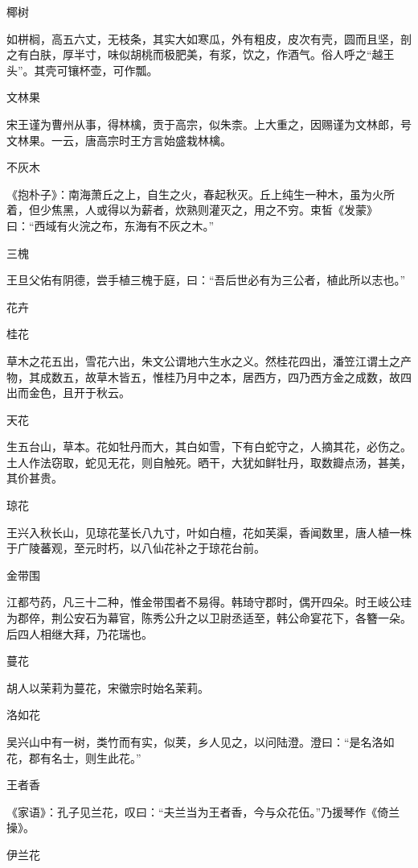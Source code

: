 \documentclass[a4paper,12pt,UTF8,twoside]{ctexbook}
\begin{document}
    椰树
    
    如栟榈，高五六丈，无枝条，其实大如寒瓜，外有粗皮，皮次有壳，圆而且坚，剖之有白肤，厚半寸，味似胡桃而极肥美，有浆，饮之，作酒气。俗人呼之“越王头”。其壳可镶杯壶，可作瓢。
    
    文林果
    
    宋王谨为曹州从事，得林檎，贡于高宗，似朱柰。上大重之，因赐谨为文林郎，号文林果。一云，唐高宗时王方言始盛栽林檎。
    
    不灰木
    
    《抱朴子》：南海萧丘之上，自生之火，春起秋灭。丘上纯生一种木，虽为火所着，但少焦黑，人或得以为薪者，炊熟则灌灭之，用之不穷。束皙《发蒙》曰：“西域有火浣之布，东海有不灰之木。”
    
    三槐
    
    王旦父佑有阴德，尝手植三槐于庭，曰：“吾后世必有为三公者，植此所以志也。”
    
    花卉
    
    桂花
    
    草木之花五出，雪花六出，朱文公谓地六生水之义。然桂花四出，潘笠江谓土之产物，其成数五，故草木皆五，惟桂乃月中之本，居西方，四乃西方金之成数，故四出而金色，且开于秋云。
    
    天花
    
    生五台山，草本。花如牡丹而大，其白如雪，下有白蛇守之，人摘其花，必伤之。土人作法窃取，蛇见无花，则自触死。晒干，大犹如鲜牡丹，取数瓣点汤，甚美，其价甚贵。
    
    琼花
    
    王兴入秋长山，见琼花茎长八九寸，叶如白檀，花如芙渠，香闻数里，唐人植一株于广陵蕃观，至元时朽，以八仙花补之于琼花台前。
    
    金带围
    
    江都芍药，凡三十二种，惟金带围者不易得。韩琦守郡时，偶开四朵。时王岐公珪为郡倅，荆公安石为幕官，陈秀公升之以卫尉丞适至，韩公命宴花下，各簪一朵。后四人相继大拜，乃花瑞也。
    
    蔓花
    
    胡人以茉莉为蔓花，宋徽宗时始名茉莉。
    
    洛如花
    
    吴兴山中有一树，类竹而有实，似荚，乡人见之，以问陆澄。澄曰：“是名洛如花，郡有名士，则生此花。”
    
    王者香
    
    《家语》：孔子见兰花，叹曰：“夫兰当为王者香，今与众花伍。”乃援琴作《倚兰操》。
    
    伊兰花
    
\end{document}
